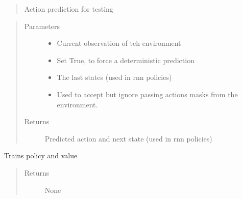 \documentclass[letterpaper,10pt,english]{sphinxmanual}
\begin{document}
\begin{fulllineitems}
\begin{fulllineitems}
\begin{quote}
\sphinxAtStartPar
Action prediction for testing
\end{quote}
\begin{quote}\begin{description}
\item[{Parameters}] \leavevmode\begin{itemize}
\item {} 
\sphinxAtStartPar
{} \textendash{} Current observation of teh environment

\item {} 
\sphinxAtStartPar
{} \textendash{} Set True, to force a deterministic prediction

\item {} 
\sphinxAtStartPar
{} \textendash{} The last states (used in rnn policies)

\item {} 
\sphinxAtStartPar
{} \textendash{} Used to accept but ignore passing actions masks from the environment.

\end{itemize}

\item[{Returns}] \leavevmode
\sphinxAtStartPar
Predicted action and next state (used in rnn policies)

\end{description}\end{quote}

\end{fulllineitems}


\begin{fulllineitems}
\label{\detokenize{agents.reinforcement_learning:agents.reinforcement_learning.ppo.PPO.train}}
\sphinxAtStartPar
Trains policy and value
\begin{quote}\begin{description}
\item[{Returns}] \leavevmode
\sphinxAtStartPar
None

\end{description}\end{quote}


\end{fulllineitems}
\end{fulllineitems}
\end{document}
